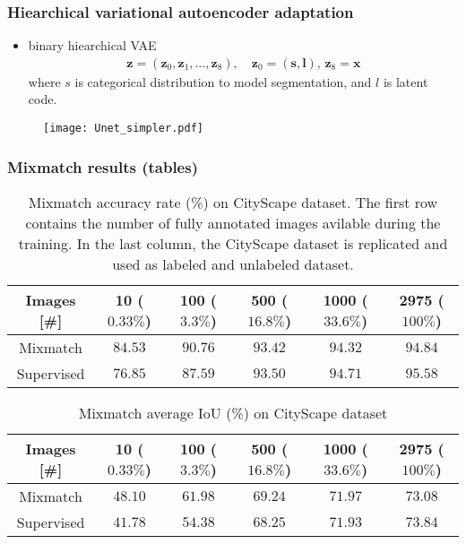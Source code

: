 \documentclass[aspectratio=169]{beamer}
\begin{document}
\begin{frame}
    \frametitle{Hiearchical variational autoencoder adaptation}
    \begin{itemize}
        \item binary hiearchical VAE 
        \begin{align*}
            \mathbf{z} = (\mathbf{z}_0, \mathbf{z}_1, \dots, \mathbf{z}_8), \quad \mathbf{z}_0 = (\mathbf{s}, \mathbf{l}),\, \mathbf{z}_8 = \mathbf{x}
        \end{align*}
        where $s$ is categorical distribution to model segmentation, and $l$ is latent code. 
    \end{itemize}
    \begin{figure}[t]
        \centering
        \texttt{[image: Unet\_simpler.pdf]}
    \end{figure}
\end{frame}



\begin{frame}
    \frametitle{Mixmatch results (tables)}
    \begin{table}[tbh]
        \begin{tabular}{|c|c|c|c|c|c|}
        \hline
        Images [\#]  & 10 ($0.33\%$) & 100 ($3.3\%$) & 500 ($16.8\%$) & 1000 ($33.6\%$)& 2975 ($100\%$) \\
        \hline
        Mixmatch & $84.53$ & $90.76$ & $93.42$ & $94.32$ & $94.84$ \\
        \hline
        Supervised & $76.85$ & $87.59$ & $93.50$ & $94.71$ & $95.58$ \\
        \hline
        \end{tabular}
        \caption{Mixmatch accuracy rate (\%) on CityScape dataset. The first row contains the number of fully annotated 
        images avilable during the training. In the last column, the CityScape dataset is replicated and used as labeled and unlabeled dataset.}
    \end{table}
    \begin{table}[tbh]
        \begin{tabular}{|c|c|c|c|c|c|}
        \hline
        Images [\#]  & 10 ($0.33\%$) & 100 ($3.3\%$) & 500 ($16.8\%$) & 1000 ($33.6\%$)& 2975 ($100\%$) \\
        \hline
        Mixmatch & $48.10$ & $61.98$ & $69.24$ & $71.97$ & $73.08$ \\
        \hline
        Supervised & $41.78$ & $54.38$ & $68.25$ & $71.93$ & $73.84$ \\
        \hline
        \end{tabular}
        \caption{Mixmatch average IoU (\%) on CityScape dataset}
    \end{table}
\end{frame}
\end{document}
